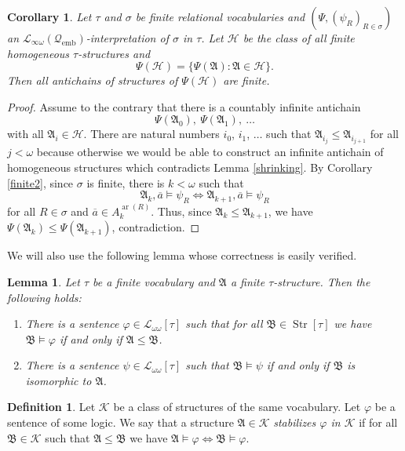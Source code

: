\documentclass{ndjflart}
\theoremstyle{plain}
\newtheorem{lemma}[conjecture]{Lemma}
\newtheorem{corollary}[conjecture]{Corollary}
\theoremstyle{definition}
\newtheorem{definition}[conjecture]{Definition}
\numberwithin{equation}{section}
\DeclareMathOperator{\emb}{emb}
\DeclareMathOperator{\Str}{Str}
\DeclareMathOperator{\ar}{ar}
\begin{document}
\begin{corollary}\label{shrinking_interpr}
Let $\tau$ and $\sigma$ be finite relational vocabularies and
$(\Psi, (\psi_R)_{R \in \sigma})$ an
$\mathcal{L}_{\infty \omega}(\mathcal{Q}_{\emb})$-interpretation of $\sigma$ in
$\tau$.
Let $\mathcal{H}$ be the class of all finite homogeneous $\tau$-structures and
\[
	\Psi(\mathcal{H}) = \{\Psi(\mathfrak{A}) \colon \mathfrak{A} \in \mathcal{H}\}.
\]
Then all antichains of structures of $\Psi(\mathcal{H})$ are finite.
\end{corollary}
\begin{proof}
Assume to the contrary that there is a countably infinite antichain
\[
	\Psi(\mathfrak{A}_0),\ \Psi(\mathfrak{A}_1),\ \dots
\]
with all $\mathfrak{A}_i \in \mathcal{H}$.
There are natural numbers $i_0$, $i_1$, $\dots$ such that
$\mathfrak{A}_{i_j} \leq \mathfrak{A}_{i_{j + 1}}$ for all $j < \omega$
because otherwise we would be able to construct an infinite antichain of
homogeneous structures which contradicts Lemma \ref{shrinking}.
By Corollary \ref{finite2}, since $\sigma$ is finite, there is $k < \omega$
such that
\[
	\mathfrak{A}_k, \overline{a} \vDash \psi_R \Leftrightarrow
	\mathfrak{A}_{k + 1}, \overline{a} \vDash \psi_R
\]
for all $R \in \sigma$ and $\overline{a} \in A_k^{\ar(R)}$.
Thus, since $\mathfrak{A}_k \leq \mathfrak{A}_{k + 1}$, we have
$\Psi(\mathfrak{A}_k) \leq \Psi(\mathfrak{A}_{k + 1})$, contradiction.
\end{proof}

We will also use the following lemma whose correctness is easily verified.

\begin{lemma}\label{substr}
Let $\tau$ be a finite vocabulary and $\mathfrak{A}$ a finite $\tau$-structure.
Then the following holds:
\begin{enumerate}
\item There is a sentence $\varphi \in \mathcal{L}_{\omega\omega}[\tau]$ such
that for all $\mathfrak{B}\in \Str[\tau]$ we have
$\mathfrak{B} \vDash \varphi$ if and only if $\mathfrak{A} \leq \mathfrak{B}$.
\item There is a sentence $\psi \in \mathcal{L}_{\omega\omega}[\tau]$ such that
$\mathfrak{B} \vDash \psi$ if and only if $\mathfrak{B}$ is isomorphic to
$\mathfrak{A}$.
\end{enumerate}
\end{lemma}

\begin{definition}
Let $\mathcal{K}$ be a class of structures of the same vocabulary.
Let $\varphi$ be a sentence of some logic.
We say that a structure $\mathfrak{A}\in\mathcal{K}$
\emph{stabilizes $\varphi$ in $\mathcal{K}$} if for all
$\mathfrak{B} \in \mathcal{K}$ such that $\mathfrak{A}\leq\mathfrak{B}$ we have
$\mathfrak{A} \vDash \varphi \Leftrightarrow \mathfrak{B} \vDash \varphi$.
\end{definition}
\end{document}
